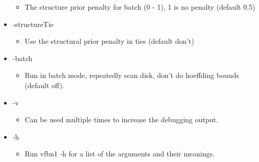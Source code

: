 \begin{itemize}
\begin{itemize}
\item The structure prior penalty for batch (0 - 1), 1 is no penalty (default 0.5)\end{itemize}
\item -structure\-Tie\begin{itemize}
\item Use the structural prior penalty in ties (default don't)\end{itemize}
\item -batch\begin{itemize}
\item Run in batch mode, repeatedly scan disk, don't do hoeffding bounds (default off).\end{itemize}
\item -v\begin{itemize}
\item Can be used multiple times to increase the debugging output.\end{itemize}
\item -h\begin{itemize}
\item Run vfbn1 -h for a list of the arguments and their meanings. \end{itemize}
\end{itemize}


